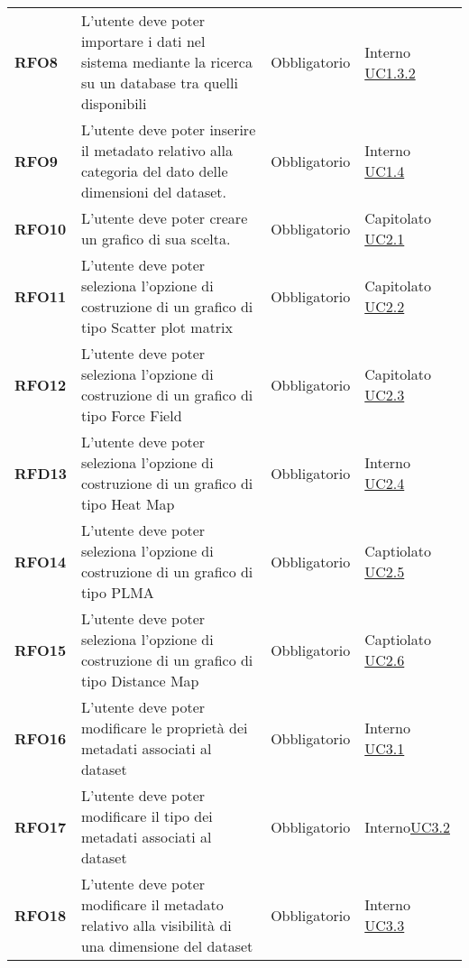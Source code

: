 \begin{longtable}[H]{>{\centering\bfseries}m{2cm} >{\centering}m{9cm} >{\centering}m{2.5cm} >{\centering\arraybackslash}m{2.5cm}}
    RFO8
    &   L'utente deve poter importare i dati nel sistema mediante la ricerca
        su un database tra quelli disponibili
    & Obbligatorio
    & Interno \hyperref[par:uc1.3.2]{UC1.3.2}\\

    RFO9
    &   L'utente deve poter inserire il metadato relativo alla categoria
        del dato delle dimensioni del dataset.
    & Obbligatorio
    & Interno \hyperref[ssub:uc1.4]{UC1.4}\\

    RFO10
    & L'utente deve poter creare un grafico di sua scelta.
    & Obbligatorio
    & Capitolato \hyperref[ssub:uc2.1]{UC2.1}\\

    RFO11
    & L'utente deve poter seleziona l'opzione di costruzione di un grafico di tipo Scatter plot matrix
    & Obbligatorio
    & Capitolato   \hyperref[ssub:uc2.2]{UC2.2}\\

    RFO12
    & L'utente deve poter seleziona l'opzione di costruzione di un grafico di tipo Force Field
    & Obbligatorio
    & Capitolato  \hyperref[ssub:uc2.3]{UC2.3}\\

    RFD13
    & L'utente deve poter seleziona l'opzione di costruzione di un grafico di tipo Heat Map
    & Obbligatorio
    & Interno  \hyperref[ssub:uc2.4]{UC2.4}\\

    RFO14
    & L'utente deve poter seleziona l'opzione di costruzione di un grafico di tipo PLMA
    & Obbligatorio
    & Captiolato   \hyperref[ssub:uc2.5]{UC2.5}\\

    RFO15
    & L'utente deve poter seleziona l'opzione di costruzione di un grafico di tipo Distance Map
    & Obbligatorio
    & Captiolato  \hyperref[ssub:UC2.6]{UC2.6}\\

    RFO16
    & L'utente deve poter modificare le proprietà dei metadati associati al dataset
    & Obbligatorio
    & Interno  \hyperref[ssub:uc3.1]{UC3.1} \\

    RFO17
    & L'utente deve poter modificare il tipo dei metadati associati al dataset
    & Obbligatorio
    & Interno\hyperref[sub:uc3.2]{UC3.2} \\

    RFO18
    & L'utente deve poter modificare il metadato relativo alla visibilità di una dimensione del dataset
    & Obbligatorio
    & Interno  \hyperref[sub:uc3.3]{UC3.3} \\


\end{longtable}
